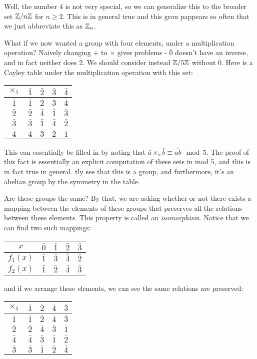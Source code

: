 \documentclass[11pt,twosided]{article}
\begin{document}
Well, the number 4 is not very special, so we can generalize this to the broader set $\mathbb Z / n\mathbb Z$ for $n \geq 2$. This is in general true and this grou pappears so often that we just abbreviate this as $\mathbb Z_n$. 

What if we now wanted a group with four elements, under a multiplication operation? Naively changing + to $\times$ gives problems - $\bar 0$ doesn't have an inverse, and in fact neither does $\bar 2$. We should consider instead $\mathbb Z /5 \mathbb Z$ without $\bar 0$. Here is a Cayley table under the multiplication operation with this set: 
\begin{center}
\begin{tabular}{c | c c c c}
$\times_5$ & $\bar 1$ & $\bar 2$ & $\bar 3$ & $\bar 4$ \\ \hline 
$\bar{1}$ & $\bar 1$ & $\bar 2$ & $\bar 3$ & $\bar 4$ \\ 
$\bar{2}$ & $\bar 2$ & $\bar 4$ & $\bar 1$ & $\bar 3$ \\ 
$\bar{3}$ & $\bar 3$ & $\bar 1$ & $\bar 4$ & $\bar 2$ \\ 
$\bar{4}$ & $\bar 4$ & $\bar 3$ & $\bar 2$ & $\bar 1$ \\ 
\end{tabular}
\end{center}
This can essentially be filled in by noting that $\bar a \times_5 \bar b \equiv \overline{ab} \mod 5$. The proof of this fact is essentially an explicit computation of these sets in mod 5, and this is in fact true in general. 
tly see that this is a group, and furthermore, it's an abelian group by the symmetry in the table.

Are these groups the same? By that, we are asking whether or not there exists a mapping between the elements of these groups that preserves all the relations between these elements. This property is called an \textit{isomorphism}. Notice that we can find two such mappings: 
\begin{center}
\begin{tabular}{c | c c c c}
$x$ & $\bar 0$ & $\bar 1$ & $\bar 2$ & $\bar 3$ \\ \hline 
$f_1(x)$ & $\bar 1$ & $\bar 3$ & $\bar 4$ & $\bar 2$ \\ 
$f_2(x)$ & $\bar 1$ & $\bar 2$ & $\bar 4$ & $\bar 3$ \\
\end{tabular}
\end{center}
and if we arrange these elements, we can see the same relations are preserved: 
\begin{center}
\begin{tabular}{c | c c c c}
$\times_5$ & $\bar 1$ & $\bar 2$ & $\bar 4$ & $\bar 3$ \\ \hline 
$\bar{1}$ & $\bar 1$ & $\bar 2$ & $\bar 4$ & $\bar 3$ \\ 
$\bar{2}$ & $\bar 2$ & $\bar 4$ & $\bar 3$ & $\bar 1$ \\ 
$\bar{4}$ & $\bar 4$ & $\bar 3$ & $\bar 1$ & $\bar 2$ \\ 
$\bar{3}$ & $\bar 3$ & $\bar 1$ & $\bar 2$ & $\bar 4$ \\ 
\end{tabular}
\end{center}
\end{document}
